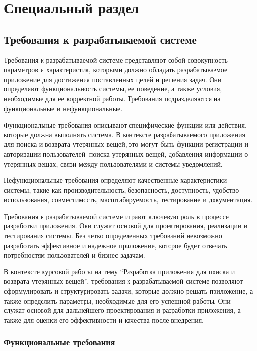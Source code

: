 \section{Специальный раздел}
\label{sec:special}

\subsection{Требования к разрабатываемой системе}

Требования к разрабатываемой системе представляют собой совокупность параметров и характеристик, которыми должно обладать разрабатываемое приложение для достижения поставленных целей и решения задач. Они определяют функциональность системы, ее поведение, а также условия, необходимые для ее корректной работы. Требования подразделяются на функциональные и нефункциональные.

Функциональные требования описывают специфические функции или действия, которые должна выполнять система. В контексте разрабатываемого приложения для поиска и возврата утерянных вещей, это могут быть функции регистрации и авторизации пользователей, поиска утерянных вещей, добавления информации о утерянных вещах, связи между пользователями и системы уведомлений.

Нефункциональные требования определяют качественные характеристики системы, такие как производительность, безопасность, доступность, удобство использования, совместимость, масштабируемость, тестирование и документация.

Требования к разрабатываемой системе играют ключевую роль в процессе разработки приложения. Они служат основой для проектирования, реализации и тестирования системы. Без четко определенных требований невозможно разработать эффективное и надежное приложение, которое будет отвечать потребностям пользователей и бизнес-задачам.

В контексте курсовой работы на тему “Разработка приложения для поиска и возврата утерянных вещей”, требования к разрабатываемой системе позволяют сформулировать и структурировать задачи, которые должно решать приложение, а также определить параметры, необходимые для его успешной работы. Они служат основой для дальнейшего проектирования и разработки приложения, а также для оценки его эффективности и качества после внедрения.

\subsubsection{Функциональные требования}

